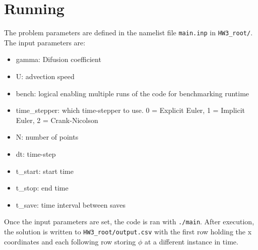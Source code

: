 \documentclass[reqno, 12pt]{amsart}
\begin{document}
    \section*{Running}
    \noindent The problem parameters are defined in the namelist file \texttt{main.inp} in \texttt{HW3\_root/}.
    The input parameters are:
    \begin{itemize}
        \setlength\itemsep{-0.1em}
        \item gamma: Difusion coefficient
        \item U: advection speed
        \item bench: logical enabling multiple runs of the code for benchmarking runtime
        \item time\_stepper: which time-stepper to use. 0 = Explicit Euler, 1 = Implicit Euler, 2 = Crank-Nicolson
        \item N: number of points
        \item dt: time-step
        \item t\_start: start time
        \item t\_stop: end time
        \item t\_save: time interval between saves
    \end{itemize}
    Once the input parameters are set, the code is ran with \texttt{./main}.
    After execution, the solution is written to \texttt{HW3\_root/output.csv} with the first row holding the x coordinates and each following row storing $\phi$ at a different instance in time.    \newpage
\end{document}
